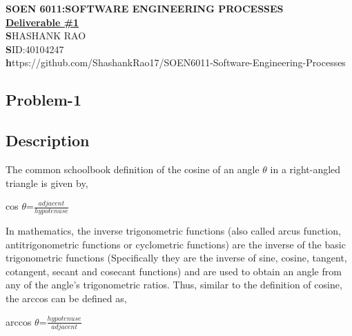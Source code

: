 \documentclass[12pt]{report}
\begin{document}
\begin{center}
	\large\textbf{SOEN 6011:SOFTWARE ENGINEERING PROCESSES}\\
	\vspace{0.10cm}\large\textbf{\underline{Deliverable \#1}}\\
	\small\textbf SHASHANK RAO\\
	\small\textbf SID:40104247\\

	\vspace{0.10cm}\small\textbf https://github.com/ShashankRao17/SOEN6011-Software-Engineering-Processes 
\end{center}
\renewcommand \thesection{\arabic{section}}
\renewcommand \thesubsection{\arabic{section}.\arabic{subsection}}
\begin{center}
	\section{Problem-1}
	
\end{center}
\subsection{Description}

		
		The common schoolbook definition of the cosine of an angle $\theta$ in a right-angled triangle is given by,
		
		\begin{center}
			\Large cos $\theta$=\Large $\frac{adjacent}{hypotenuse}$
		\end{center}
		
		In mathematics, the inverse trigonometric functions (also called arcus function, antitrigonometric functions or cyclometric functions) are the inverse of the basic trigonometric functions (Specifically they are the inverse of sine, cosine, tangent, cotangent, secant and cosecant functions) and are used to obtain an angle from any of the angle’s trigonometric ratios. Thus, similar to the definition of cosine, the arccos can be defined as,
		\begin{center}
			\Large arccos $\theta$=\Large$\frac{hypotenuse}{adjacent}$
		\end{center}
	
\end{document}
